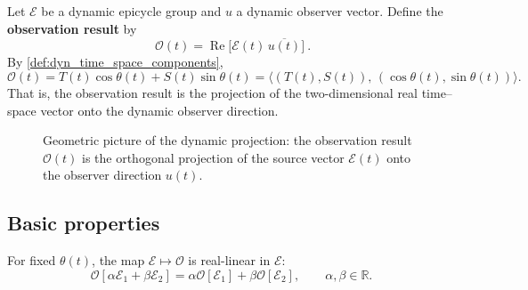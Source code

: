 \begin{definition}\label{def:dyn_projection}
Let $\mathcal E$ be a dynamic epicycle group and $u$ a dynamic observer vector. Define the \textbf{observation result} by
\[
\boxed{\ \mathcal O(t)=\operatorname{Re}\!\big[\mathcal E(t)\,\overline{u(t)}\big]\ }.
\]
By \cref{def:dyn_time_space_components},
\[
\mathcal O(t)=T(t)\cos\theta(t)+S(t)\sin\theta(t)
=\big\langle (T(t),S(t)),\,(\cos\theta(t),\sin\theta(t))\big\rangle.
\]
That is, the observation result is the projection of the two-dimensional real time--space vector onto the dynamic observer direction.
\end{definition}

\begin{figure}[htbp]
\centering
{}
\caption{Geometric picture of the dynamic projection: the observation result $\mathcal O(t)$ is the orthogonal projection of the source vector $\mathcal E(t)$ onto the observer direction $u(t)$.}
\label{fig:dyn_projection_geometry}
\end{figure}

\subsection{Basic properties}

\begin{proposition}\label{prop:dyn_projection_linearity}
For fixed $\theta(t)$, the map $\mathcal E\mapsto\mathcal O$ is real-linear in $\mathcal E$:
\[
\mathcal O[\alpha\mathcal E_1+\beta\mathcal E_2]
=\alpha\mathcal O[\mathcal E_1]+\beta\mathcal O[\mathcal E_2],
\qquad \alpha,\beta\in\mathbb R.
\]
\end{proposition}

